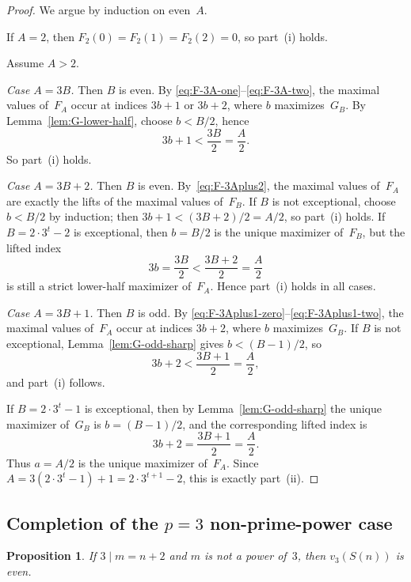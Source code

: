\documentclass[10pt]{amsart}
\newtheorem{proposition}[theorem]{Proposition}
\theoremstyle{definition}
\theoremstyle{remark}
\begin{document}
\begin{proof}
We argue by induction on even~$A$.

If $A=2$, then $F_2(0)=F_2(1)=F_2(2)=0$, so part~(i) holds.

Assume $A>2$.

\smallskip
\emph{Case $A=3B$.}  Then $B$ is even.  By
\eqref{eq:F-3A-one}--\eqref{eq:F-3A-two}, the maximal values of~$F_A$
occur at indices $3b+1$ or $3b+2$, where $b$ maximizes~$G_B$.
By Lemma~\ref{lem:G-lower-half}, choose $b < B/2$, hence
\[
3b+1 < \frac{3B}{2} = \frac{A}{2}.
\]
So part~(i) holds.

\smallskip
\emph{Case $A=3B+2$.}  Then $B$ is even.  By~\eqref{eq:F-3Aplus2},
the maximal values of~$F_A$ are exactly the lifts of the maximal values
of~$F_B$.
If $B$ is not exceptional, choose $b < B/2$ by induction; then
$3b+1 < (3B+2)/2 = A/2$, so part~(i) holds.
If $B = 2\cdot 3^t - 2$ is exceptional, then $b=B/2$ is the unique
maximizer of~$F_B$, but the lifted index
\[
3b = \frac{3B}{2} < \frac{3B+2}{2} = \frac{A}{2}
\]
is still a strict lower-half maximizer of~$F_A$.  Hence part~(i)
holds in all cases.

\smallskip
\emph{Case $A=3B+1$.}  Then $B$ is odd.  By
\eqref{eq:F-3Aplus1-zero}--\eqref{eq:F-3Aplus1-two}, the maximal values
of~$F_A$ occur at indices $3b+2$, where $b$ maximizes~$G_B$.
If $B$ is not exceptional, Lemma~\ref{lem:G-odd-sharp} gives
$b < (B-1)/2$, so
\[
3b+2 < \frac{3B+1}{2} = \frac{A}{2},
\]
and part~(i) follows.

If $B = 2\cdot 3^t - 1$ is exceptional, then by
Lemma~\ref{lem:G-odd-sharp} the unique maximizer of~$G_B$ is
$b=(B-1)/2$, and the corresponding lifted index is
\[
3b+2 = \frac{3B+1}{2} = \frac{A}{2}.
\]
Thus $a=A/2$ is the unique maximizer of~$F_A$.  Since
$A = 3(2\cdot 3^t - 1)+1 = 2\cdot 3^{t+1}-2$, this is exactly part~(ii).
\end{proof}

\subsection{Completion of the $p=3$ non-prime-power case}

\begin{proposition}\label{prop:p3-nonpp}
If $3 \mid m=n+2$ and $m$ is not a power of~$3$, then $v_3(S(n))$ is even.
\end{proposition}
\end{document}
